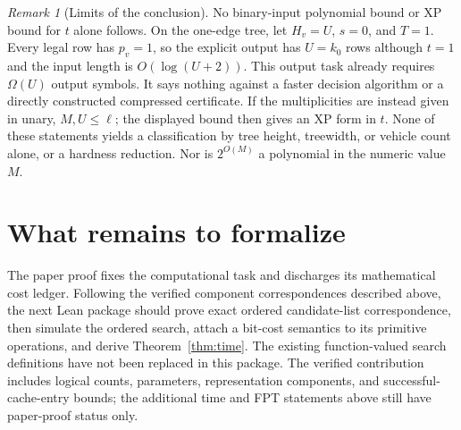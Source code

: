 \documentclass[11pt,a4paper]{article}
\theoremstyle{definition}
\theoremstyle{remark}
\newtheorem{remark}[theorem]{Remark}
\begin{document}
\begin{remark}[Limits of the conclusion]
No binary-input polynomial bound or XP bound for \(t\) alone follows.
On the one-edge tree, let \(H_v=U\), \(s=0\), and \(T=1\). Every legal
row has \(p_v=1\), so the explicit output has \(U=k_0\) rows although
\(t=1\) and the input length is \(O(\log(U+2))\). This output task already
requires \(\Omega(U)\) output symbols. It says nothing against a faster
decision algorithm or a directly constructed compressed certificate.
If the multiplicities are instead given in unary, \(M,U\le\ell\);
the displayed bound then gives an XP form in \(t\). None of these
statements yields a classification by tree height, treewidth, or vehicle
count alone, or a hardness reduction. Nor is \(2^{O(M)}\) a polynomial
in the numeric value \(M\).
\end{remark}

\section{What remains to formalize}
The paper proof fixes the computational task and discharges its mathematical
cost ledger. Following the verified component correspondences described above,
the next Lean package should prove exact ordered candidate-list correspondence,
then simulate the ordered search, attach a bit-cost semantics to its primitive
operations, and derive Theorem~\ref{thm:time}. The existing function-valued
search definitions have not been replaced in this package. The verified
contribution includes logical counts, parameters, representation components,
and successful-cache-entry bounds; the additional time and FPT statements
above still have paper-proof status only.
\end{document}
